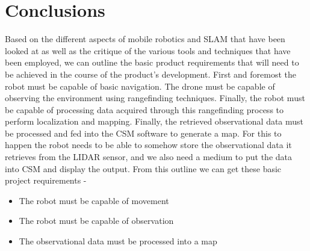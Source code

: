 		\chapter{Conclusions}
		Based on the different aspects of mobile robotics and SLAM that have been looked at as well as the critique of the various tools and techniques that have been employed, we can outline the basic product requirements that will need to be achieved in the course of the product's development. First and foremost the robot must be capable of basic navigation. The drone must be capable of observing the environment using rangefinding techniques. Finally, the robot must be capable of processing data acquired through this rangefinding process to perform localization and mapping. Finally, the retrieved observational data must be processed and fed into the CSM software to generate a map. For this to happen the robot needs to be able to somehow store the observational data it retrieves from the LIDAR sensor, and we also need a medium to put the data into CSM and display the output. From this outline we can get these basic project requirements -
		
		\begin{itemize}
			\item The robot must be capable of movement
			\item The robot must be capable of observation
			\item The observational data must be processed into a map
		\end{itemize}
	
	
	
		
				
	